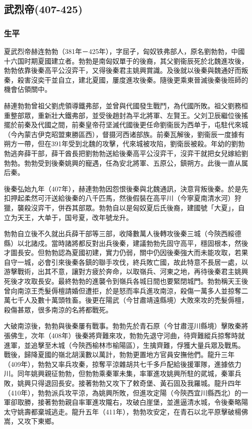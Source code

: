 
\subsection{武烈帝\tiny(407-425)}

\subsubsection{生平}

夏武烈帝赫连勃勃（381年－425年），字屈孑，匈奴铁弗部人，原名劉勃勃，中國十六国时期夏國建立者。勃勃是南匈奴單于的後裔，其父劉衞辰死於北魏進攻後，勃勃依靠後秦高平公沒弈干，又得後秦君主姚興賞識。及後就以後秦與魏通好而叛秦，殺害沒奕干並自立，建北夏國，屢度進攻後秦。隨後更乘東晉滅後秦後班師的機會佔領關中。

赫連勃勃曾祖父劉虎領導鐵弗部，並曾與代國發生戰鬥，為代國所敗。祖父劉務桓重整部眾，重新壯大鐵弗部，並受後趙封為平北將軍、左賢王。父刘卫辰繼位後搖擺於前秦及代國之間，前秦皇帝苻坚滅代國後更任命劉衞辰为西单于，屯駐代來城（今內蒙古伊克昭盟東勝區西），督摄河西诸部族。前秦瓦解後，劉衞辰一度據有朔方一帶，但在391年受到北魏的攻擊，代來城被攻陷，劉衛辰被殺。年幼的劉勃勃逃奔薛干部，薛干酋長把劉勃勃送給後秦高平公沒弈干，沒弈干就把女兒嫁給劉勃勃。勃勃受到後秦姚興的寵遇，任為安北將軍、五原公，鎮朔方。此後一直从属后秦。

後秦弘始九年（407年），赫連勃勃因怨恨後秦與北魏通訊，決意背叛後秦。於是先扣押起柔然可汗送給後秦的八千匹馬，然後假裝在高平川（今寧夏南清水河）狩獵，襲殺沒弈干，併吞其部眾。勃勃自以是匈奴夏后氏後裔，建國號「大夏」，自立为天王，大单于，国号夏，改年號龙升。

勃勃自立後不久就出兵薛干部等三部，收降數萬人後轉攻後秦三城（今陝西綏德縣）以北諸戍。當時諸將都反對出兵後秦，建議勃勃先固守高平，穩固根本，然後才圖長安。但勃勃認為夏國初建，實力仍弱，關中仍因後秦強大而未能攻取，若果自守一城，必會引來後秦各鎮的聯手攻伐，終兵敗亡國，故此特意不長居一處，以游擊戰術，出其不意，讓對方疲於奔命，以取嶺兵、河東之地，再待後秦君主姚興死後才攻取長安。最終勃勃的進襲令到嶺兵各城日間也要緊閉城門。勃勃稱天王後曾向南涼王禿髮傉檀請婚但遭拒，於是怒而率兵進攻南涼，殺傷一萬多人並掠奪二萬七千人及數十萬頭牲畜。後更在陽武（今甘肅靖遠縣境）大敗來攻的禿髮傉檀，殺傷甚眾，很多南涼的名將都戰死。

大破南涼後，勃勃與後秦屢有戰事。勃勃先於青石原（今甘肅涇川縣境）擊敗秦將張佛生，次年（408年）後秦將齊難來攻，勃勃先退守河曲，待齊難縱兵掠奪時就進軍，並追擊至木城（今陝西榆林市榆陽區），生擒齊難，俘獲大量兵眾及戰馬。戰後，歸降夏國的嶺北胡漢數以萬計，勃勃更置地方官員安撫他們。龍升三年（409年），勃勃又率兵攻秦，掠奪平涼雜胡共七千多戶配給後援軍隊，進據依力川。同年姚興親征勃勃，但勃勃乘秦軍未集，率軍進攻姚興所駐的貮城，秦軍兵敗，姚興只得退回長安。接著勃勃又攻下了敕奇堡、黃石固及我羅城。龍升四年（410年），勃勃派兵攻平涼，為姚興所敗，但進攻定陽（今陝西宜川縣西北）的一軍卻取勝，接著勃勃親自率軍進攻隴右，攻破白崖堡，並進逼清水城，令後秦略陽太守姚壽都棄城逃走。龍升五年（411年），勃勃攻安定，在青石以北平原擊破楊佛嵩，又攻下東鄉。

